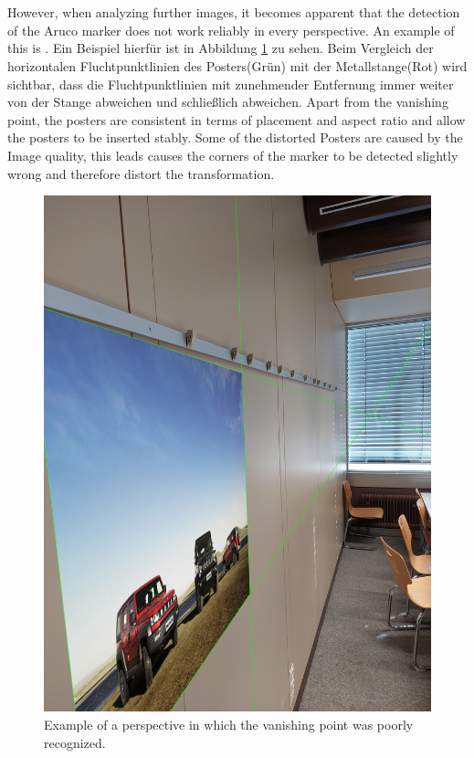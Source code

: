 \documentclass[a4paper,twocolumn]{article}
\begin{document}
    \\
\\
However, when analyzing further images, it becomes apparent that the detection of the Aruco marker does not work reliably in every perspective. An example of this is . Ein Beispiel hierfür ist in Abbildung \ref{fig:bad-example-result} zu sehen. Beim Vergleich der horizontalen Fluchtpunktlinien des Posters(Grün) mit der Metallstange(Rot) wird sichtbar, dass die Fluchtpunktlinien mit zunehmender Entfernung immer weiter von der Stange abweichen und schließlich abweichen.
Apart from the vanishing point, the posters are consistent in terms of placement and aspect ratio and allow the posters to be inserted stably. Some of the distorted Posters are caused by the Image quality, this leads causes the corners of the marker to be detected slightly wrong and therefore distort the transformation.
\begin{figure}[h!]
    \centering
    \includegraphics[width=0.9\columnwidth]{img/img_result_bad_113437.jpg} %
    \caption{Example of a perspective in which the vanishing point was poorly recognized.}
    \label{fig:bad-example-result}
\end{figure}
\end{document}
